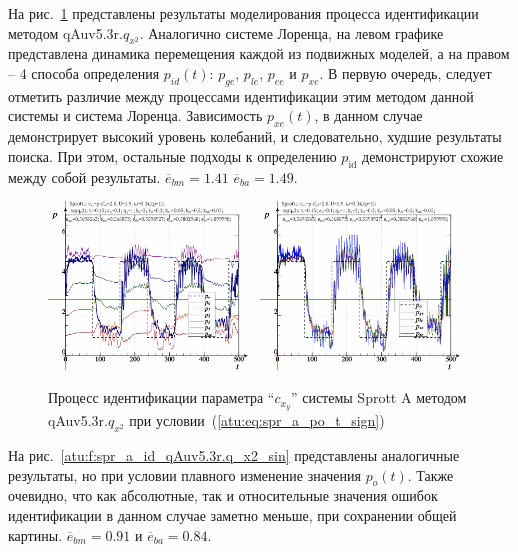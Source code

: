 На рис.~\ref{atu:f:spr_a_id_qAuv5.3r.q_x2_sign} представлены результаты
моделирования процесса идентификации
методом qAuv5.3r.$q_{x^2}$. Аналогично системе Лоренца, на левом графике представлена
динамика перемещения каждой из подвижных моделей,
а на правом -- 4 способа определения $p_{id}(t)$:
$p_{ge}$, $p_{le}$, $p_{ee}$ и $p_{xe}$.
В первую очередь, следует отметить различие между процессами
идентификации этим методом данной системы и система Лоренца.
Зависимость $p_{xe}(t)$, в данном случае демонстрирует
высокий уровень колебаний, и следовательно,
худшие результаты поиска. При этом,
остальные подходы к определению $p_\mathrm{id}$
демонстрируют схожие между собой результаты.
$\overline{e}_{bm}=1.41$
$\overline{e}_{ba}=1.49$.


\begin{figure}[h!]
  \centerline{
    \includegraphics[width=0.49\textwidth]{p/cha/spr_a/qAuv5.3r/sprott_a_qAuv5_3r_qx2-p_t_pi_sign.png}
    \hfill
    \includegraphics[width=0.49\textwidth]{p/cha/spr_a/qAuv5.3r/sprott_a_qAuv5_3r_qx2-p_t_pz_sign.png}
  }
  \caption{Процесс идентификации параметра ``$c_{x_y}$'' системы Sprott A методом qAuv5.3r.$q_{x^2}$ при условии~(\ref{atu:eq:spr_a_po_t_sign})}
  \label{atu:f:spr_a_id_qAuv5.3r.q_x2_sign}
\end{figure}

На рис.~\ref{atu:f:spr_a_id_qAuv5.3r.q_x2_sin} представлены аналогичные результаты,
но при условии плавного изменение значения $p_o(t)$. Также очевидно, что
как абсолютные, так и относительные значения ошибок идентификации в данном случае заметно
меньше, при сохранении общей картины.
$\overline{e}_{bm}=0.91$
и
$\overline{e}_{ba}=0.84$.

